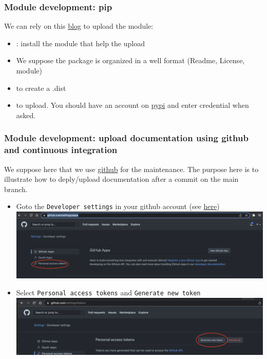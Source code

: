 \documentclass[8pt]{beamer}
\begin{document}
\begin{frame}
  \frametitle{Module development: pip}
    We can rely on this \href{https://www.geeksforgeeks.org/how-to-publish-python-package-at-pypi-using-twine-module}{blog} to upload the module:
    \begin{itemize}
    \item {} : install the module that help the upload 
    \item We suppose the package is organized in a well format (Readme, License, module)
     \item {} to create a .dist
     \item {} to upload. You should have an account on \href{pypi.org}{pypi} and enter credential when asked.
    \end{itemize}
\end{frame}

\begin{frame}
  \frametitle{Module development: upload documentation using github and continuous integration}
    We suppose here that we use \href{https://github.com}{github} for the maintenance. The purpose here is to illustrate how to deply\slash upload documentation after a commit on the main branch.
    \begin{itemize}
      \item Goto the \texttt{Developer settings} in your github account (see \href{https://github.com/settings/apps}{here})
      \includegraphics[width=10.cm]{github_settings.png}
      \item Select \texttt{Personal access tokens} and \texttt{Generate new token} \\
     \includegraphics[width=8.cm]{generate_token.png}
    \end{itemize}
\end{frame}
\end{document}
